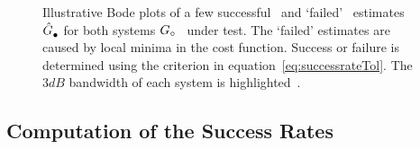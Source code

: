 \begin{figure}
  \centering
  \setlength{\figurewidth}{0.8\columnwidth}
  \setlength{\figureheight}{0.6\figurewidth}
  
 \caption[Bodeplot of successful ad failed estimates.]{Illustrative Bode plots of a few successful~ and `failed'~ estimates $\hat{G}_{\mathrm{\bullet}}^{\mathrm{}}$ for both systems ${G}_{\circ}$~ under test.
 The `failed' estimates are caused by local minima in the cost function.
 Success or failure is determined using the criterion in equation~\eqref{eq:successrateTol}. The $3\unit{dB}$ bandwidth of each system is highlighted~.}
\label{fig:exampleFRF}
\end{figure}

\subsection{Computation of  the Success Rates}\label{se:CompuSR}


